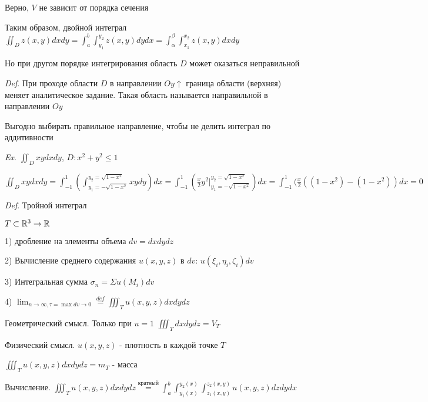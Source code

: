 \documentclass[12pt]{article}
\begin{document}
    Верно, $V$ не зависит от порядка сечения

    Таким образом, двойной интеграл $\displaystyle \iint_D z(x, y) dxdy = \int_a^b \int_{y_1}^{y_2} z(x, y) dydx = \int_\alpha^\beta \int_{x_1}^{x_2} z(x, y) dxdy$

    Но при другом порядке интегрирования область $D$ может оказаться неправильной

    \vspace{3mm}
\textit{Def}. При проходе области $D$ в направлении $Oy \uparrow$ граница области (верхняя) меняет аналитическое задание. Такая область называется направильной в направлении $Oy$

    Выгодно выбирать правильное направление, чтобы не делить интеграл по аддитивности

    \vspace{3mm}
\textit{Ex}. $\displaystyle \iint_D xy dx dy$, $D : x^2 + y^2 \leq 1$

    $\displaystyle \iint_D xy dx dy = \int_{-1}^1 (\int_{y_1 = -\sqrt{1-x^2}}^{y_2 = \sqrt{1-x^2}} xy dy) dx = \int_{-1}^1 (\frac{x}{2} y^2 \Big|_{y_1 = -\sqrt{1-x^2}}^{y_2 = \sqrt{1-x^2}}) dx =
    \int_{-1}^1 (\frac{x}{2} ((1 - x^2) - (1 - x^2)) dx = 0$

    \vspace{3mm}
\textit{Def}. Тройной интеграл

    $T \subset \mathbb{R}^3 \rightarrow \mathbb{R}$

    1) дробление на элементы объема $dv = dxdydz$

    2) Вычисление среднего содержания $u(x, y, z)$ в $dv$: $u(\xi_i, \eta_i, \zeta_i) dv$

    3) Интегральная сумма $\displaystyle \sigma_n = \Sigma u(M_i) dv$

    4) $\displaystyle \lim_{n \to \infty, \tau = \max dv \to 0} \stackrel{def}{=} \iiint_T u(x, y, z) dxdydz$

    Геометрический смысл. Только при $u = 1$ $\displaystyle \iiint_T dxdydz = V_T$

    Физический смысл. $u(x, y, z)$ - плотность в каждой точке $T$

    $\displaystyle \iiint_T u(x, y, z) dxdydz = m_T$ - масса

    Вычисление. $\displaystyle \iiint_T u(x, y, z) dxdydz \stackrel{\text{кратный}}{=} \int^b_a \int_{y_1(x)}^{y_2(x)} \int_{z_1(x, y)}^{z_2(x, y)} u(x, y, z) dz dy dx$
\end{document}
